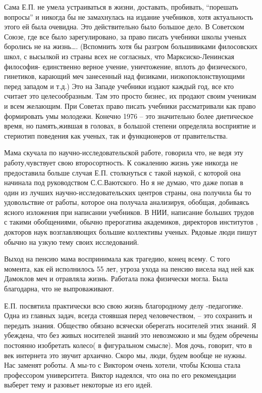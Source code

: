 Сама Е.П. не умела устраиваться в жизни, доставать, пробивать, “порешать вопросы” и никогда бы не замахнулась на  издание  учебников, хотя актуальность этого ей была очевидна. Это действительно было большое дело. В Советском Союзе, где все было зарегулировано, за право писать учебники школы ученых боролись не на жизнь…. (Вспомнить хотя бы разгром большивиками филосовских школ, с высылкой из страны всех не согласных, что Марксиско-Ленинская философия- единственно верное учение, уничтожение, вплоть до физического, гинетиков, карающий меч занесенный над физиками, низкопоклонствующими перед западом  и т.д.) Это на Западе учебники издают каждый год, все кто считает это целесообразным. Там это просто бизнес, их продают своим ученикам и всем желающим. При Советах право писать учебники рассматривали как право формировать умы молодежи. Конечно 1976 – это значительно более диетическое время, но память,жившая в головах, в большой степени определяла восприятие и стериотип поведения как ученых, так и функционеров от правительства.

Мама скучала по научно-исследовательской работе, говорила что, не ведя эту работу,чувствует свою второсортность. К сожалению жизнь уже никогда не предоставила больше случая Е.П. столкнуться с такой наукой, с которой она начинала под руководством С.С.Ваютского. Но я не думаю, что даже попав в один из лучших научно-исследовательских центров страны, она получила бы то удовольствие от работы, которое она получала анализируя, обобщая, добиваясь ясного изложения при написании учебников. В НИИ, написание больших трудов с такими обобщениями, обычно прерогатива академиков, директоров институтов , докторов наук возглавляющих большие коллективы ученых. Рядовые люди пишут обычно на узкую тему своих исследований.

Выход на пенсию мама воспринимала как трагедию, конец всему. С того момента, как ей исполнилось 55 лет, угроза ухода на пенсию висела над ней как Дамоклов меч и отравляла жизнь. Работала пока физически могла. Была благодарна, что не выпроваживают.

Е.П. посвятила практически всю свою жизнь благородному делу -педагогике. Одна из главных задач, всегда стоявшая перед человечеством, – это сохранить и передать знания. Общество обязано всячески оберегать носителей этих знаний. Я убеждена, что без живых носителей знаний это невозможно и мы будем обречены постоянно изобретать колесо( в фигуральном смысле). Моя дочь, говорит, что в век интернета это звучит архаично. Скоро мы, люди, будем вообще не нужны. Нас заменят роботы. А мы-то с Виктором очень хотели, чтобы Ксюша стала профессором университета. Виктор надеялся, что она по его рекомендации выберет тему и разовьет некоторые из его идей.

